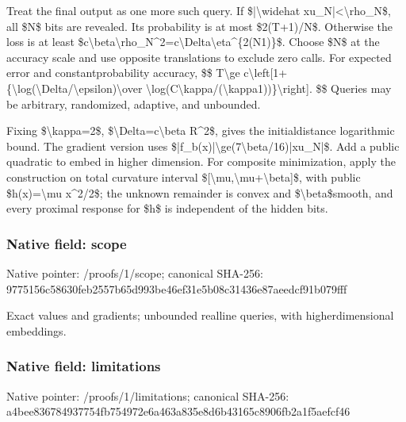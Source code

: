 \documentclass[10pt,a4paper]{article}
\begin{document}
Treat the final output as one more such query. If \$|\textbackslash{}widehat xu\_N|<\textbackslash{}rho\_N\$, all \$N\$ bits are revealed. Its probability is at most \$2(T+1)/N\$. Otherwise the loss is at least
\$c\textbackslash{}beta\textbackslash{}rho\_N\textasciicircum{}2=c\textbackslash{}Delta\textbackslash{}eta\textasciicircum{}\{2(N1)\}\$.
Choose \$N\$ at the accuracy scale and use opposite translations to exclude zero calls. For expected error and constantprobability accuracy,
\$\$
T\textbackslash{}ge c\textbackslash{}left[1+\{\textbackslash{}log(\textbackslash{}Delta/\textbackslash{}epsilon)\textbackslash{}over
\textbackslash{}log(C\textbackslash{}kappa/(\textbackslash{}kappa1))\}\textbackslash{}right].
\$\$
Queries may be arbitrary, randomized, adaptive, and unbounded.

Fixing \$\textbackslash{}kappa=2\$, \$\textbackslash{}Delta=c\textbackslash{}beta R\textasciicircum{}2\$, gives the initialdistance logarithmic bound. The gradient version uses
\$|f\_b(x)|\textbackslash{}ge(7\textbackslash{}beta/16)|xu\_N|\$.
Add a public quadratic to embed in higher dimension. For composite minimization, apply the construction on total curvature interval \$[\textbackslash{}mu,\textbackslash{}mu+\textbackslash{}beta]\$, with public \$h(x)=\textbackslash{}mu x\textasciicircum{}2/2\$; the unknown remainder is convex and \$\textbackslash{}beta\$smooth, and every proximal response for \$h\$ is independent of the hidden bits.


\subsubsection{Native field: scope}


Native pointer: /proofs/1/scope; canonical SHA-256: 9775156c58630feb2557b65d\allowbreak{}993be46ef31e5b08c31436e8\allowbreak{}7aeedcf91b079fff


Exact values and gradients; unbounded realline queries, with higherdimensional embeddings.


\subsubsection{Native field: limitations}


Native pointer: /proofs/1/limitations; canonical SHA-256: a4bee836784937754fb75497\allowbreak{}2e6a463a835e8d6b43165c89\allowbreak{}06fb2a1f5aefcf46
\end{document}
